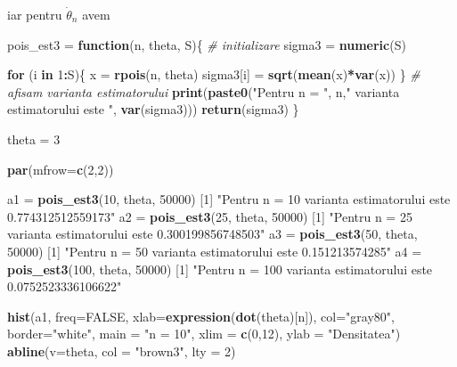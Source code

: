\documentclass[
]{article}
\newenvironment{Shaded}{\begin{snugshade}}{\end{snugshade}}
\newcommand{\CommentTok}[1]{\textcolor[rgb]{0.56,0.35,0.01}{\textit{#1}}}
\newcommand{\ControlFlowTok}[1]{\textcolor[rgb]{0.13,0.29,0.53}{\textbf{#1}}}
\newcommand{\DataTypeTok}[1]{\textcolor[rgb]{0.13,0.29,0.53}{#1}}
\newcommand{\DecValTok}[1]{\textcolor[rgb]{0.00,0.00,0.81}{#1}}
\newcommand{\KeywordTok}[1]{\textcolor[rgb]{0.13,0.29,0.53}{\textbf{#1}}}
\newcommand{\NormalTok}[1]{#1}
\newcommand{\OperatorTok}[1]{\textcolor[rgb]{0.81,0.36,0.00}{\textbf{#1}}}
\newcommand{\OtherTok}[1]{\textcolor[rgb]{0.56,0.35,0.01}{#1}}
\newcommand{\StringTok}[1]{\textcolor[rgb]{0.31,0.60,0.02}{#1}}
\begin{document}
iar pentru \(\dot{\theta}_n\) avem

\begin{Shaded}
\begin{Highlighting}[]
\NormalTok{pois_est3 =}\StringTok{ }\ControlFlowTok{function}\NormalTok{(n, theta, S)\{}
  \CommentTok{# initializare}
\NormalTok{  sigma3 =}\StringTok{ }\KeywordTok{numeric}\NormalTok{(S)}
  
  \ControlFlowTok{for}\NormalTok{ (i }\ControlFlowTok{in} \DecValTok{1}\OperatorTok{:}\NormalTok{S)\{}
\NormalTok{    x =}\StringTok{ }\KeywordTok{rpois}\NormalTok{(n, theta)}
\NormalTok{    sigma3[i] =}\StringTok{ }\KeywordTok{sqrt}\NormalTok{(}\KeywordTok{mean}\NormalTok{(x)}\OperatorTok{*}\KeywordTok{var}\NormalTok{(x))}
\NormalTok{  \}}
  \CommentTok{# afisam varianta estimatorului}
  \KeywordTok{print}\NormalTok{(}\KeywordTok{paste0}\NormalTok{(}\StringTok{"Pentru n = "}\NormalTok{, n,}\StringTok{" varianta estimatorului este "}\NormalTok{, }\KeywordTok{var}\NormalTok{(sigma3)))}
  \KeywordTok{return}\NormalTok{(sigma3)}
\NormalTok{\}}

\NormalTok{theta =}\StringTok{ }\DecValTok{3}

\KeywordTok{par}\NormalTok{(}\DataTypeTok{mfrow=}\KeywordTok{c}\NormalTok{(}\DecValTok{2}\NormalTok{,}\DecValTok{2}\NormalTok{))}

\NormalTok{a1 =}\StringTok{ }\KeywordTok{pois_est3}\NormalTok{(}\DecValTok{10}\NormalTok{, theta, }\DecValTok{50000}\NormalTok{)}
\NormalTok{[}\DecValTok{1}\NormalTok{] }\StringTok{"Pentru n = 10 varianta estimatorului este 0.774312512559173"}
\NormalTok{a2 =}\StringTok{ }\KeywordTok{pois_est3}\NormalTok{(}\DecValTok{25}\NormalTok{, theta, }\DecValTok{50000}\NormalTok{)}
\NormalTok{[}\DecValTok{1}\NormalTok{] }\StringTok{"Pentru n = 25 varianta estimatorului este 0.300199856748503"}
\NormalTok{a3 =}\StringTok{ }\KeywordTok{pois_est3}\NormalTok{(}\DecValTok{50}\NormalTok{, theta, }\DecValTok{50000}\NormalTok{)}
\NormalTok{[}\DecValTok{1}\NormalTok{] }\StringTok{"Pentru n = 50 varianta estimatorului este 0.151213574285"}
\NormalTok{a4 =}\StringTok{ }\KeywordTok{pois_est3}\NormalTok{(}\DecValTok{100}\NormalTok{, theta, }\DecValTok{50000}\NormalTok{)}
\NormalTok{[}\DecValTok{1}\NormalTok{] }\StringTok{"Pentru n = 100 varianta estimatorului este 0.0752523336106622"}


\KeywordTok{hist}\NormalTok{(a1, }\DataTypeTok{freq=}\OtherTok{FALSE}\NormalTok{, }\DataTypeTok{xlab=}\KeywordTok{expression}\NormalTok{(}\KeywordTok{dot}\NormalTok{(theta)[n]), }
     \DataTypeTok{col=}\StringTok{"gray80"}\NormalTok{, }\DataTypeTok{border=}\StringTok{"white"}\NormalTok{, }\DataTypeTok{main =} \StringTok{"n = 10"}\NormalTok{, }\DataTypeTok{xlim =} \KeywordTok{c}\NormalTok{(}\DecValTok{0}\NormalTok{,}\DecValTok{12}\NormalTok{),}
     \DataTypeTok{ylab =} \StringTok{"Densitatea"}\NormalTok{)}
\KeywordTok{abline}\NormalTok{(}\DataTypeTok{v=}\NormalTok{theta, }\DataTypeTok{col =} \StringTok{"brown3"}\NormalTok{, }\DataTypeTok{lty =} \DecValTok{2}\NormalTok{)}


\end{Highlighting}
\end{Shaded}
\end{document}
